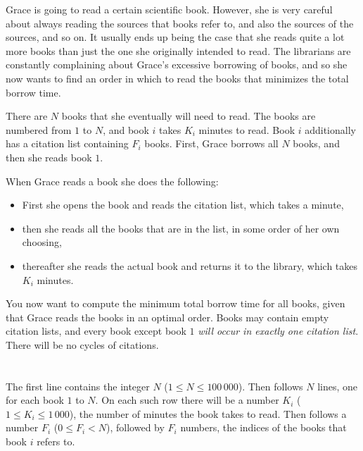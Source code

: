 \def\version{jury-1}

Grace is going to read a certain scientific book.
However, she is very careful about always reading the sources that books refer
to, and also the sources of the sources, and so on.
It usually ends up being the case that she reads quite a lot more books than
just the one she originally intended to read.
The librarians are constantly complaining about Grace's excessive borrowing of
books, and so she now wants to find an order in which to read the books that
minimizes the total borrow time.

There are $N$ books that she eventually will need to read.
The books are numbered from $1$ to $N$, and book $i$ takes $K_i$ minutes to read.
Book $i$ additionally has a citation list containing $F_i$ books.
First, Grace borrows all $N$ books, and then she reads book $1$.

When Grace reads a book she does the following:

\begin{itemize}
\item First she opens the book and reads the citation list, which takes a minute,
\item then she reads all the books that are in the list, in some order of her own choosing,
\item thereafter she reads the actual book and returns it to the library, which takes $K_i$ minutes.
\end{itemize}

You now want to compute the minimum total borrow time for all books, given that Grace reads the books in an optimal order.
Books may contain empty citation lists, and every book except book $1$ {\em will occur in exactly one citation list}.
There will be no cycles of citations.

\section*{}
The first line contains the integer $N$ ($1 \le N \le 100\,000$).
Then follows $N$ lines, one for each book $1$ to $N$.
On each such row there will be a number $K_i$ ($1 \le K_i \le 1\,000$), the number of minutes the book takes to read.
Then follows a number $F_i$ ($0 \le F_i < N$), followed by $F_i$ numbers, the indices of the books that book $i$ refers to.

